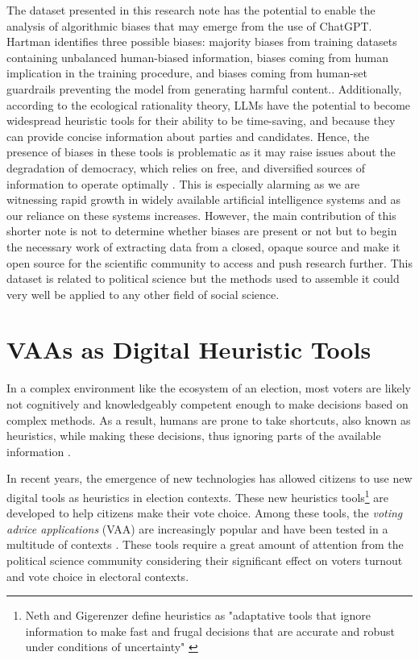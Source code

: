 \documentclass{article}
\begin{document}
The dataset presented in this research note has the potential to enable the analysis of algorithmic biases that may emerge from the use of ChatGPT. Hartman identifies three possible biases: majority biases from training datasets containing unbalanced human-biased information, biases coming from human implication in the training procedure, and biases coming from human-set guardrails preventing the model from generating harmful content.\parencite{hartmann_etal23}. Additionally, according to the ecological rationality theory, LLMs have the potential to become widespread heuristic tools for their ability to be time-saving, and because they can provide concise information about parties and candidates. Hence, the presence of biases in these tools is problematic as it may raise issues about the degradation of democracy, which relies on free, and diversified sources of information to operate optimally \parencite{dahl06}. This is especially alarming as we are witnessing rapid growth in widely available artificial intelligence systems and as our reliance on these systems increases. \parencite{rozado23} However, the main contribution of this shorter note is not to determine whether biases are present or not but to begin the necessary work of extracting data from a closed, opaque source and make it open source for the scientific community to access and push research further. This dataset is related to political science but the methods used to assemble it could very well be applied to any other field of social science.\par

\section{VAAs as Digital Heuristic Tools}

In a complex environment like the ecosystem of an election, most voters are likely not cognitively and knowledgeably competent enough to make decisions based on complex methods. As a result, humans are prone to take shortcuts, also known as heuristics, while making these decisions, thus ignoring parts of the available information \parencite{gigerenzer_gaissmaier11}. \par

In recent years, the emergence of new technologies has allowed citizens to use new digital tools as heuristics in election contexts. These new heuristics tools\footnote{ Neth and Gigerenzer define heuristics as "adaptative tools that ignore information to make fast and frugal decisions that are accurate and robust under conditions of uncertainty" \parencite{neth_gigerenzer15}} are developed to help citizens make their vote choice. Among these tools, the \textit{voting advice applications} (VAA) are increasingly popular and have been tested in a multitude of contexts \parencite{garzia_marschall12, garzia_marschall19}. These tools require a great amount of attention from the political science community considering their significant effect on voters turnout and vote choice in electoral contexts.
\end{document}
